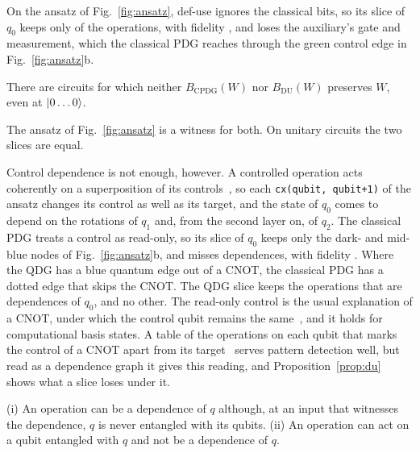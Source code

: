 On the ansatz of Fig.~\ref{fig:ansatz}, def-use ignores the classical bits, so its slice of $q_0$ keeps only \numAnsDuOps{} of the \numAnsOps{} operations, with fidelity
\numAnsDuFidelity{}, and loses the auxiliary's gate and measurement, which the classical PDG reaches
through the green control edge in Fig.~\ref{fig:ansatz}b.

\begin{proposition}\label{prop:du}
There are circuits for which neither $B_{\mathrm{CPDG}}(W)$ nor $B_{\mathrm{DU}}(W)$ preserves $W$, even
at $\lvert 0\dots0\rangle$.
\end{proposition}

The ansatz of Fig.~\ref{fig:ansatz} is a witness for both. On unitary circuits the two slices are equal.

Control dependence is not enough, however. A controlled operation acts coherently on a superposition of
its controls~\cite{svore2018qsharp}, so each \texttt{cx(qubit, qubit+1)} of the ansatz changes its
control as well as its target, and the state of $q_0$ comes to depend on the rotations of $q_1$ and, from
the second layer on, of $q_2$. The classical PDG treats a control as read-only, so its slice of $q_0$
keeps only the \numAnsCpdgOps{} dark- and mid-blue nodes of
Fig.~\ref{fig:ansatz}b, and misses \numAnsCpdgMissed{} dependences, with fidelity \numAnsCpdgFidelity{}.
Where the QDG has a blue quantum edge out of a CNOT, the classical PDG has a dotted edge that skips the
CNOT. The QDG slice keeps the \numAnsWireOps{} operations that are dependences of $q_0$, and no other.
The read-only control is the usual explanation of a CNOT, under which the control qubit remains the
same~\cite{ramalho2025road}, and it holds for computational basis states. A table of the operations on each
qubit that marks the control of a CNOT apart from its target~\cite{behler2024supporting} serves pattern
detection well, but read as a dependence graph it gives this reading, and Proposition~\ref{prop:du} shows
what a slice loses under it.

\begin{proposition}\label{prop:ent}
(i) An operation can be a dependence of $q$ although, at an input that witnesses the dependence, $q$ is
never entangled with its qubits.
(ii) An operation can act on a qubit entangled with $q$ and not be a dependence of $q$.
\end{proposition}

